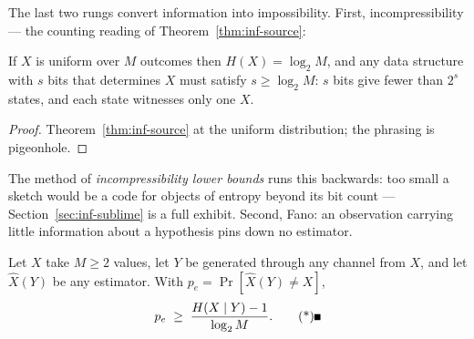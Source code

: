 \begin{widefigure}[t]
\caption{R\'enyi divergence vs.\ the order $\alpha$ for two Bernoulli distributions:
nondecreasing, through KL at $\alpha = 1$, converging to the max-divergence pure DP
bounds --- R\'enyi-DP certifies one point of this curve.}
\label{fig:inf-renyi}
\end{widefigure}

The last two rungs convert information into impossibility. First, incompressibility ---
the counting reading of Theorem~\ref{thm:inf-source}:

\begin{corollary}[Incompressibility]\label{cor:inf-counting}
If $X$ is uniform over $M$ outcomes then $H(X) = \log_2 M$, and any data structure
with $s$ bits that determines $X$ must satisfy $s \ge \log_2 M$: $s$ bits give fewer
than $2^s$ states, and each state witnesses only one $X$. \eop
\end{corollary}

\begin{proof}
Theorem~\ref{thm:inf-source} at the uniform distribution; the phrasing is pigeonhole.
\end{proof}

The method of \emph{incompressibility lower bounds} runs this backwards: too small a
sketch would be a code for objects of entropy beyond its bit count ---
Section~\ref{sec:inf-sublime} is a full exhibit. Second, Fano: an observation carrying
little information about a hypothesis pins down no estimator.

\begin{theorem}[Fano]\label{thm:inf-fano}
Let $X$ take $M \ge 2$ values, let $Y$ be generated through any channel from $X$, and
let $\hat X(Y)$ be any estimator. With $p_e = \Pr[\hat X(Y) \ne X]$,
\[
p_e \;\ge\; \frac{H(X \mid Y) - 1}{\log_2 M}. \eopm
\]
\end{theorem}

